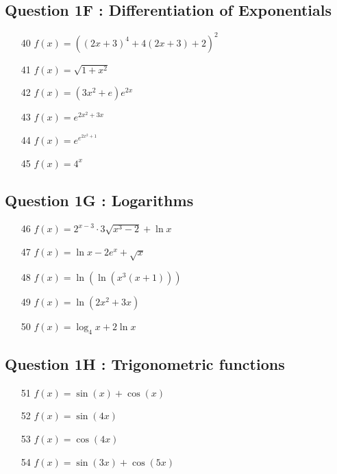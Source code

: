 \documentclass[]{article}
\begin{document}
\subsection*{Question 1F : Differentiation of Exponentials}
{
	\Large
	\begin{multicols}{2}
		\begin{itemize}
			
			\item[40] $ f(x) = ((2x+3)^4 + 4(2x+3) +2)^2 $ \,
			\item[41] $ f(x) = \sqrt{1+x^2} $ \,
			\item[42] $ f(x) = (3x^2+e)e^{2x}$ \,
			\item[43] $ f(x) = e^{2x^2+3x}$\,
			\item[44] $ f(x) = e^{e^{2x^2+1}}$\,
			\item[45] $ f(x) = 4^x$ \,
		\end{itemize}
	\end{multicols}
}
\subsection*{Question 1G : Logarithms}
{
	\Large
	\begin{multicols}{2}
		\begin{itemize}
			\item[46] $ f(x) = 2^{x-3}\cdot3\sqrt{x^3-2}+\ln x$ \,
			\item[47] $ f(x) = \ln x - 2e^x + \sqrt{x}$ \,
			\item[48] $ f(x) = \ln(\ln(x^3(x+1))) $ \,
			\item[49] $ f(x) = \ln(2x^2+3x)$ 
			\item[50] $ f(x) = \log_4 x + 2\ln x$ \,
		\end{itemize}
	\end{multicols}
}
\subsection*{Question 1H : Trigonometric functions}
{
	\Large
	\begin{multicols}{2}
		\begin{itemize}
			\item[51] $ f(x) = \sin(x)+\cos(x)$ \,
			\item[52] $ f(x) = \sin(4x)$
			\item[53] $ f(x) = \cos(4x)$
			\item[54] $ f(x) = \sin(3x)+\cos(5x)$ \,
 		\end{itemize}
	\end{multicols}
}
\end{document}
